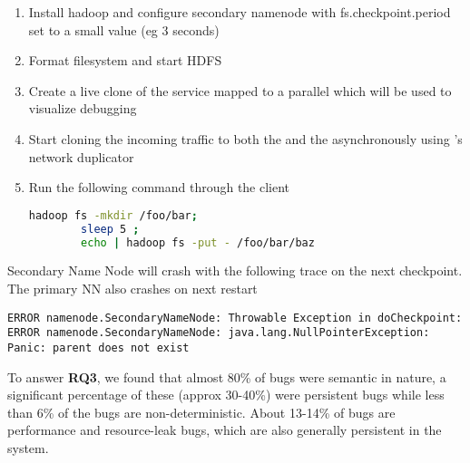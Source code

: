 \begin{adjustwidth}{0.5cm}{}
	\begin{enumerate}
		\item Install hadoop and configure secondary namenode with fs.checkpoint.period set to a small value (eg 3 seconds)
		\item Format filesystem and start HDFS
		\item Create a live clone of the service mapped to a parallel \debugcontainer which will be used to visualize debugging
		\item Start cloning the incoming traffic to both the \productioncontainer and the \debugcontainer asynchronously using \parikshan's network duplicator
		\item Run the following command through the client
		
		\begin{lstlisting}[language=sh]
		hadoop fs -mkdir /foo/bar; 
		sleep 5 ; 
		echo | hadoop fs -put - /foo/bar/baz
		\end{lstlisting}		
	\end{enumerate}

Secondary Name Node will crash with the following trace on the next checkpoint. The primary NN also crashes on next restart

\begin{lstlisting}
ERROR namenode.SecondaryNameNode: Throwable Exception in doCheckpoint:
ERROR namenode.SecondaryNameNode: java.lang.NullPointerException: Panic: parent does not exist
\end{lstlisting}

\end{adjustwidth}





\begin{tcolorbox}
	To answer \textbf{RQ3}, we found that almost 80\% of bugs were semantic in nature, a significant percentage of these (approx 30-40\%) were persistent bugs while less than 6\% of the bugs are non-deterministic.
	About 13-14\% of bugs are performance and resource-leak bugs, which are also generally persistent in the system.
\end{tcolorbox}

